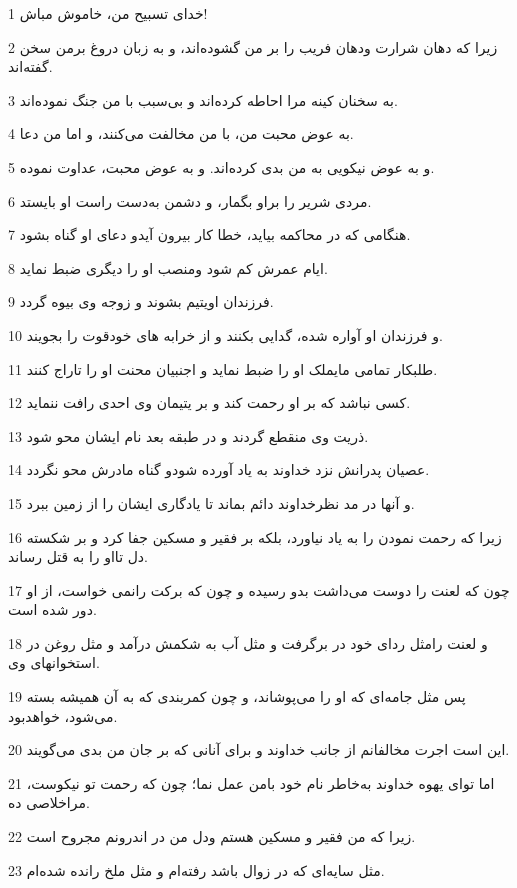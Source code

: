 \par 1 خدای تسبیح من، خاموش مباش!
\par 2 زیرا که دهان شرارت ودهان فریب را بر من گشوده‌اند، و به زبان دروغ برمن سخن گفته‌اند.
\par 3 به سخنان کینه مرا احاطه کرده‌اند و بی‌سبب با من جنگ نموده‌اند.
\par 4 به عوض محبت من، با من مخالفت می‌کنند، و اما من دعا.
\par 5 و به عوض نیکویی به من بدی کرده‌اند. و به عوض محبت، عداوت نموده.
\par 6 مردی شریر را براو بگمار، و دشمن به‌دست راست او بایستد.
\par 7 هنگامی که در محاکمه بیاید، خطا کار بیرون آیدو دعای او گناه بشود.
\par 8 ایام عمرش کم شود ومنصب او را دیگری ضبط نماید.
\par 9 فرزندان اویتیم بشوند و زوجه وی بیوه گردد.
\par 10 و فرزندان او آواره شده، گدایی بکنند و از خرابه های خودقوت را بجویند.
\par 11 طلبکار تمامی مایملک او را ضبط نماید و اجنبیان محنت او را تاراج کنند.
\par 12 کسی نباشد که بر او رحمت کند و بر یتیمان وی احدی رافت ننماید.
\par 13 ذریت وی منقطع گردند و در طبقه بعد نام ایشان محو شود.
\par 14 عصیان پدرانش نزد خداوند به یاد آورده شودو گناه مادرش محو نگردد.
\par 15 و آنها در مد نظرخداوند دائم بماند تا یادگاری ایشان را از زمین ببرد.
\par 16 زیرا که رحمت نمودن را به یاد نیاورد، بلکه بر فقیر و مسکین جفا کرد و بر شکسته دل تااو را به قتل رساند.
\par 17 چون که لعنت را دوست می‌داشت بدو رسیده و چون که برکت رانمی خواست، از او دور شده است.
\par 18 و لعنت رامثل ردای خود در بر‌گرفت و مثل آب به شکمش درآمد و مثل روغن در استخوانهای وی.
\par 19 پس مثل جامه‌ای که او را می‌پوشاند، و چون کمربندی که به آن همیشه بسته می‌شود، خواهدبود.
\par 20 این است اجرت مخالفانم از جانب خداوند و برای آنانی که بر جان من بدی می‌گویند.
\par 21 اما تو‌ای یهوه خداوند به‌خاطر نام خود بامن عمل نما؛ چون که رحمت تو نیکوست، مراخلاصی ده.
\par 22 زیرا که من فقیر و مسکین هستم ودل من در اندرونم مجروح است.
\par 23 مثل سایه‌ای که در زوال باشد رفته‌ام و مثل ملخ رانده شده‌ام.
